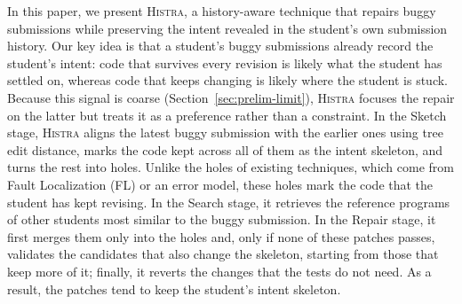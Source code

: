 \documentclass[10pt,conference]{IEEEtran}
\begin{document}
In this paper, we present \textsc{Histra}, a history-aware technique that repairs buggy submissions while preserving the intent revealed in the student's own submission history. Our key idea is that a student's buggy submissions already record the student's intent: code that survives every revision is likely what the student has settled on, whereas code that keeps changing is likely where the student is stuck. Because this signal is coarse (Section~\ref{sec:prelim-limit}), \textsc{Histra} focuses the repair on the latter but treats it as a preference rather than a constraint. In the Sketch stage, \textsc{Histra} aligns the latest buggy submission with the earlier ones using tree edit distance, marks the code kept across all of them as the intent skeleton, and turns the rest into holes. Unlike the holes of existing techniques, which come from Fault Localization (FL) or an error model, these holes mark the code that the student has kept revising. In the Search stage, it retrieves the reference programs of other students most similar to the buggy submission. In the Repair stage, it first merges them only into the holes and, only if none of these patches passes, validates the candidates that also change the skeleton, starting from those that keep more of it; finally, it reverts the changes that the tests do not need. As a result, the patches tend to keep the student's intent skeleton.
\end{document}
